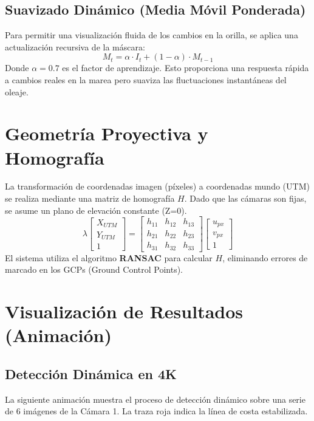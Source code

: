 \documentclass[12pt,a4paper]{article}
\begin{document}
\subsection{Suavizado Dinámico (Media Móvil Ponderada)}
Para permitir una visualización fluida de los cambios en la orilla, se aplica una actualización recursiva de la máscara:
\begin{equation}
    M_t = \alpha \cdot I_t + (1 - \alpha) \cdot M_{t-1}
\end{equation}
Donde $\alpha = 0.7$ es el factor de aprendizaje. Esto proporciona una respuesta rápida a cambios reales en la marea pero suaviza las fluctuaciones instantáneas del oleaje.

\section{Geometría Proyectiva y Homografía}
La transformación de coordenadas imagen (píxeles) a coordenadas mundo (UTM) se realiza mediante una matriz de homografía $H$. Dado que las cámaras son fijas, se asume un plano de elevación constante (Z=0).
\begin{equation}
    \lambda \begin{bmatrix} X_{UTM} \\ Y_{UTM} \\ 1 \end{bmatrix} = \begin{bmatrix} h_{11} & h_{12} & h_{13} \\ h_{21} & h_{22} & h_{23} \\ h_{31} & h_{32} & h_{33} \end{bmatrix} \begin{bmatrix} u_{px} \\ v_{px} \\ 1 \end{bmatrix}
\end{equation}
El sistema utiliza el algoritmo \textbf{RANSAC} para calcular $H$, eliminando errores de marcado en los GCPs (Ground Control Points).

\newpage
\section{Visualización de Resultados (Animación)}

\subsection{Detección Dinámica en 4K}
La siguiente animación muestra el proceso de detección dinámico sobre una serie de 6 imágenes de la Cámara 1. La traza roja indica la línea de costa estabilizada.
\end{document}
